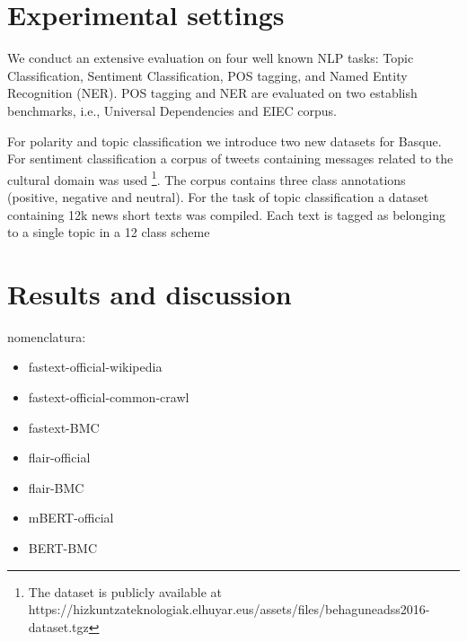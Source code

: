 \documentclass[10pt, a4paper]{article}
\begin{document}
\section{Experimental settings}
\label{sec:exper-sett}

We conduct an extensive evaluation on four well known NLP tasks: Topic Classification, Sentiment Classification, POS tagging, and Named Entity Recognition (NER). POS tagging and NER are evaluated on two establish benchmarks, i.e., Universal Dependencies and EIEC corpus. 

For polarity and topic classification we introduce two new datasets for Basque. For sentiment classification a corpus of tweets containing messages related to the cultural domain was used \cite{san2019multilingual}\footnote{The dataset is publicly available at https://hizkuntzateknologiak.elhuyar.eus/assets/files/behaguneadss2016-dataset.tgz}. The corpus contains three class annotations (positive, negative and neutral). For the task of topic classification a dataset containing 12k news short texts was compiled. Each text is tagged as belonging to a single topic in a 12 class scheme



\section{Results and discussion}
\label{sec:results-discussion}

nomenclatura: \begin{itemize}
    \item fastext-official-wikipedia 
    \item fastext-official-common-crawl 
    \item fastext-BMC
    \item flair-official
    \item flair-BMC
    \item mBERT-official
    \item BERT-BMC
\end{itemize}



\end{document}
